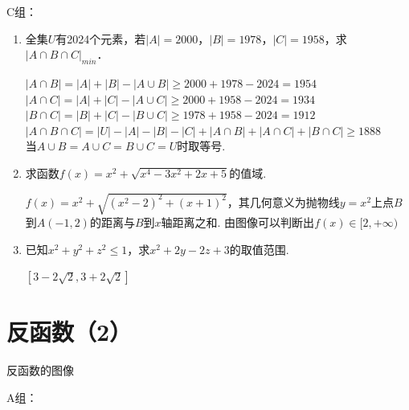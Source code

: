 C组：
\begin{enumerate}
    \item 全集$U$有2024个元素，若$|A| = 2000$，$|B| = 1978$，$|C| = 1958$，求$|A\cap B \cap C|_{min}$．
    \begin{jieda}
    $|A \cap B| = |A| + |B| - |A \cup B| \geq 2000 + 1978 - 2024 = 1954$ \\
    $|A \cap C| = |A| + |C| - |A \cup C| \geq 2000 + 1958 - 2024 = 1934$ \\
    $|B \cap C| = |B| + |C| - |B \cup C| \geq 1978 + 1958 - 2024 = 1912$ \\
    $|A\cap B \cap C| = |U| - |A| - |B| - |C| + |A \cap B| + |A \cap C| + |B \cap C| \geq 1888$ \\
    当$A \cup B = A \cup C = B \cup C = U$时取等号.
    \end{jieda}
    \begin{vspace_}
        \vsp[3]
    \end{vspace_}
    \item 求函数$f(x) = x^2 + \sqrt{x^4 - 3x^2+2x+5}$的值域.
    \begin{jieda}
    $f(x) = x^2 + \sqrt{(x^2-2)^2+(x+1)^2}$，其几何意义为抛物线$y = x^2$上点$B$到$A(-1, 2)$的距离与$B$到$x$轴距离之和. 由图像可以判断出$f(x) \in [2, +\infty)$ 
    
    \end{jieda}
    \item 已知$x^2+y^2+z^2 \leq 1$，求$x^2+2y-2z+3$的取值范围.
    \begin{jieda}
        $[3-2\sqrt{2}, 3+2\sqrt{2}]$
    \end{jieda}
\end{enumerate}

\section{反函数（2）}

\zsd 反函数的图像

A组：

